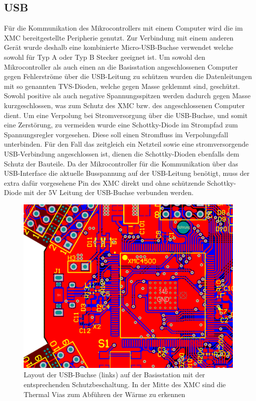 \subsection{USB}
Für die Kommunikation des Mikrocontrollers mit einem Computer wird die im XMC bereitgestellte Peripherie genutzt. Zur Verbindung mit einem anderen Gerät wurde deshalb eine kombinierte Micro-USB-Buchse verwendet welche sowohl für Typ A oder Typ B Stecker geeignet ist.
Um sowohl den Mikrocontroller als auch einen an die Basisstation angeschlossenen Computer gegen Fehlerströme über die USB-Leitung zu schützen wurden die Datenleitungen mit so genannten \ac{TVS}-Dioden, welche gegen Masse geklemmt sind, geschützt. Sowohl positive als auch negative Spannungsspitzen werden dadurch gegen Masse kurzgeschlossen, was zum Schutz des XMC bzw. des angeschlossenen Computer dient. Um eine Verpolung bei Stromversorgung über die USB-Buchse, und somit eine Zerstörung, zu vermeiden wurde eine Schottky-Diode im Strompfad zum Spannungsregler vorgesehen. Diese soll einen Stromfluss im Verpolungsfall unterbinden. Für den Fall das zeitgleich ein Netzteil sowie eine stromversorgende USB-Verbindung angeschlossen ist, dienen die Schottky-Dioden ebenfalls dem Schutz der Bauteile. Da der Mikrocontroller für die Kommunikation über das USB-Interface die aktuelle Busspannung auf der USB-Leitung benötigt, muss der extra dafür vorgesehene Pin des XMC direkt und ohne schützende Schottky-Diode mit der 5V Leitung der USB-Buchse verbunden werden. 
\begin{figure}[h]
\centering
\includegraphics[width=0.7\linewidth]{"Abbildungen/Aufnahmen/Bilder/Altium/USB und XMC"}
\caption[Layout der USB-Buchse mit der entsprechenden Schutzbeschaltung]{Layout der USB-Buchse (links) auf der Basisstation mit der entsprechenden Schutzbeschaltung. In der Mitte des XMC sind die Thermal Vias zum Abführen der Wärme zu erkennen}
\label{fig:usb-und-xmc}
\end{figure}


